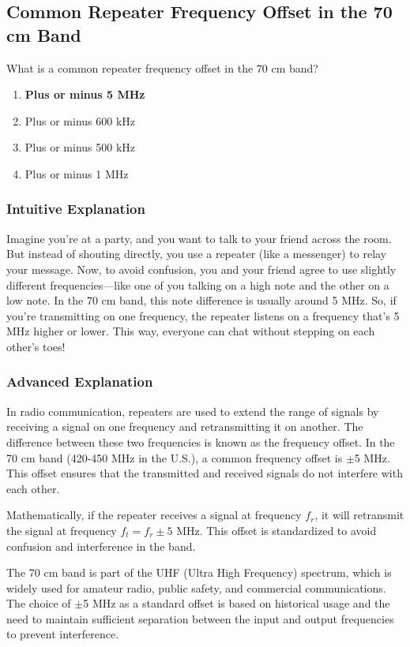 \subsection{Common Repeater Frequency Offset in the 70 cm Band}
\label{T2A03}

\begin{tcolorbox}[colback=gray!10!white,colframe=black!75!black,title=T2A03]
What is a common repeater frequency offset in the 70 cm band?
\begin{enumerate}[label=\Alph*)]
    \item \textbf{Plus or minus 5 MHz}
    \item Plus or minus 600 kHz
    \item Plus or minus 500 kHz
    \item Plus or minus 1 MHz
\end{enumerate}
\end{tcolorbox}

\subsubsection{Intuitive Explanation}
Imagine you're at a party, and you want to talk to your friend across the room. But instead of shouting directly, you use a repeater (like a messenger) to relay your message. Now, to avoid confusion, you and your friend agree to use slightly different frequencies—like one of you talking on a high note and the other on a low note. In the 70 cm band, this note difference is usually around 5 MHz. So, if you're transmitting on one frequency, the repeater listens on a frequency that's 5 MHz higher or lower. This way, everyone can chat without stepping on each other's toes!

\subsubsection{Advanced Explanation}
In radio communication, repeaters are used to extend the range of signals by receiving a signal on one frequency and retransmitting it on another. The difference between these two frequencies is known as the frequency offset. In the 70 cm band (420-450 MHz in the U.S.), a common frequency offset is $\pm$5 MHz. This offset ensures that the transmitted and received signals do not interfere with each other.

Mathematically, if the repeater receives a signal at frequency $f_r$, it will retransmit the signal at frequency $f_t = f_r \pm 5 \text{ MHz}$. This offset is standardized to avoid confusion and interference in the band.

The 70 cm band is part of the UHF (Ultra High Frequency) spectrum, which is widely used for amateur radio, public safety, and commercial communications. The choice of $\pm$5 MHz as a standard offset is based on historical usage and the need to maintain sufficient separation between the input and output frequencies to prevent interference.

